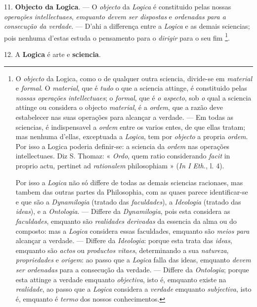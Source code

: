 11. \textbf{Objecto da Logica}. --- O \emph{objecto} da \emph{Logica} é constituido pelas nossas \emph{operações intellectuaes}, \emph{emquanto devem ser dispostas} e \emph{ordenadas para a consecução da verdade}. --- D'ahi a differença entre a \emph{Logica} e as demais sciencias; pois nenhuma d'estas estuda o pensamento para o \emph{dirigir} para o seu fim \footnote{O \emph{objecto} da Logica, como o de qualquer outra sciencia, divide-se em \emph{material} e \emph{formal}. O \emph{material}, que é \emph{tudo} o que a sciencia attinge, é constituido pelas \emph{nossas operações intellectuaes}; o \emph{formal}, que é \emph{o aspecto}, sob \emph{o} qual a sciencia attinge ou considera o objecto \emph{material}, é a \emph{ordem}, que a razão deve estabelecer nas suas operações para alcançar a verdade. --- Em todas as sciencias, é indispensavel a \emph{ordem} entre os varios entes, de que ellas tratam; mas nenhuma d'ellas, exceptuada a \emph{Logica}, tem por \emph{objecto} a propria \emph{ordem}. Por isso a Logica poderia definir-se: a sciencia da \emph{ordem} nas operações intellectuaes. Diz S. Thomaz: « \emph{Ordo}, quem ratio considerando \emph{facit} in proprio actu, pertinet ad \emph{rationalem} philosophiam » (\emph{In I Eth.}, l. 4).\par Por isso a \emph{Logica} não só differe de todas as demais sciencias racionaes, mas tambem das outras partes da Philosophia, com as quaes parece identificar-se e que são a \emph{Dynamilogia} (tratado das \emph{faculdades}), a \emph{Ideologia} (tratado das \emph{ideas}), e a \emph{Ontologia}. --- Differe da \emph{Dynamilogia}, pois esta considera as \emph{faculdades}, emquanto são \emph{realidades derivadas} da essencia da alma ou do composto: mas a \emph{Logica} considera essas faculdades, emquanto são \emph{meios para} alcançar a verdade. --- Differe da \emph{Ideologia}: porque esta trata das \emph{ideas}, emquanto são \emph{actos} ou \emph{productos vitaes}, determinando a sua \emph{natureza}, \emph{propriedades} e \emph{origem}: ao passo que a \emph{Logica} falla das ideas, emquanto \emph{devem ser ordenadas} para a consecução da verdade. --- Differe da \emph{Ontologia}; porque esta attinge a verdade emquanto \emph{objectiva}, isto é, emquanto existe na \emph{realidade}, ao passo que a \emph{Logica} considera a \emph{verdade} emquanto \emph{subjectiva}, isto é, emquanto é \emph{termo} dos nossos conhecimentos.}.

12. A \textbf{Logica} é arte e \textbf{sciencia}.

